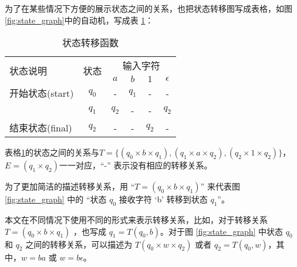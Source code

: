 \begin{remark}
    为了在某些情况下方便的展示状态之间的关系，也把状态转移图写成表格\cite{book1}，如图\ref{fig:state_graph}中的自动机，写成表 \ref{tab:sample}：
\begin{table}[!htbp]
    \caption{状态转移函数}
    \label{tab:sample}
    \centering
    \small%
    \setlength{\tabcolsep}{6pt}%
    \renewcommand{\arraystretch}{1.2}%
    \begin{tabular}{lccccc}
        \toprule%
        \multirow{2}{*}{状态说明} & \multirow{2}{*}{状态} & \multicolumn{4}{c}{输入字符} \\
		\cline{3-6}      &    & $a$ & $b$ & $1$ & ${\epsilon}$ \\
        \midrule%
        开始状态(start)  & $q_0$ & -     & $q_1$  &      - &     -    \\
                        & $q_1$ & $q_2$ &    -   &    -   &    $q_2$ \\
        结束状态(final) & $q_2$ &   -   & -      & $q_2$  &    -     \\
        \bottomrule%
    \end{tabular}
\end{table}
\end{remark}


表格\ref{tab:sample}的状态之间的关系与$T=\{(q_0 \times b \times q_1),(q_1\times a \times q_2),(q_2\times 1 \times q_2)\}$，$E=(q_1 \times q_2)$一一对应，“\mbox{-}” 表示没有相应的转移关系。%

\begin{remark}[转移关系的表示]
    为了更加简洁的描述转移关系，用 “$T=(q_0 \times b \times q_1)$” 来代表图 \ref{fig:state_graph} 中的 “状态 $q_0$ 接收字符 ‘b’ 转移到状态 $q_1$”。
\end{remark}

\begin{remark}
    本文在不同情况下使用不同的形式来表示转移关系，比如，对于转移关系 $T=(q_0 \times b \times q_1)$ ，也写成 $ q_1 = T(q_0 , b) $。对于图 \ref{fig:state_graph} 中状态 $q_0$ 和 $q_2$ 之间的转移关系，可以描述为 $T(q_0\times w \times q_2)$ 或者 $q_2=T(q_0 , w)$，其中，$w=ba$ 或 $w=b\epsilon$。
\end{remark}

